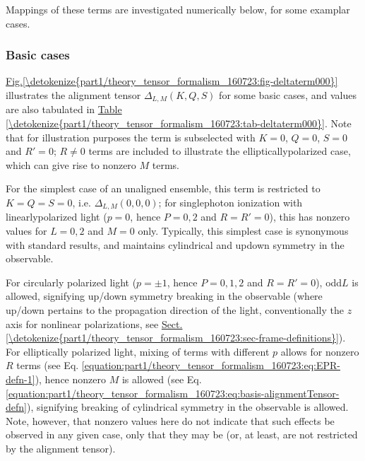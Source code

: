 \documentclass[letterpaper,table,10pt,english]{jupyterBook}
\begin{document}
\sphinxAtStartPar
Mappings of these terms are investigated numerically below, for some examplar cases.


\subsubsection{Basic cases}
\label{\detokenize{part1/theory_tensor_formalism_160723:basic-cases}}\label{\detokenize{part1/theory_tensor_formalism_160723:sec-theory-af-alignment-term-basic}}
\sphinxAtStartPar
\hyperref[\detokenize{part1/theory_tensor_formalism_160723:fig-deltaterm000}]{Fig.\@ \ref{\detokenize{part1/theory_tensor_formalism_160723:fig-deltaterm000}}} illustrates the alignment tensor \(\Delta_{L,M}(K,Q,S)\) for some basic cases, and values are also tabulated in \hyperref[\detokenize{part1/theory_tensor_formalism_160723:tab-deltaterm000}]{Table \ref{\detokenize{part1/theory_tensor_formalism_160723:tab-deltaterm000}}}. Note that for illustration purposes the term is subselected with \(K=0\), \(Q=0\), \(S=0\) and \(R'=0\); \(R\neq0\) terms are included to illustrate the elliptically\sphinxhyphen{}polarized case, which can give rise to non\sphinxhyphen{}zero \(M\) terms.

\sphinxAtStartPar
For the simplest case of an unaligned ensemble, this term is restricted to \(K=Q=S=0\), i.e. \(\Delta_{L,M}(0,0,0)\); for single\sphinxhyphen{}photon ionization with linearly\sphinxhyphen{}polarized light (\(p=0\), hence \(P=0,2\) and \(R=R'=0\)), this has non\sphinxhyphen{}zero values for \(L=0,2\) and \(M=0\) only. Typically, this simplest case is synonymous with standard {\hyperref[\detokenize{backmatter/glossary:term-LF}]{}} results, and maintains cylindrical and up\sphinxhyphen{}down symmetry in the observable.

\sphinxAtStartPar
For circularly polarized light (\(p=\pm1\), hence \(P=0,1,2\) and \(R=R'=0\)), odd\sphinxhyphen{}\(L\) is allowed, signifying up/down symmetry breaking in the observable (where up/down pertains to the propagation direction of the light, conventionally the \(z\)\sphinxhyphen{}axis for non\sphinxhyphen{}linear polarizations, see \hyperref[\detokenize{part1/theory_tensor_formalism_160723:sec-frame-definitions}]{Sect.\@ \ref{\detokenize{part1/theory_tensor_formalism_160723:sec-frame-definitions}}}). For elliptically polarized light, mixing of terms with different \(p\) allows for non\sphinxhyphen{}zero \(R\) terms (see Eq. \eqref{equation:part1/theory_tensor_formalism_160723:eq:EPR-defn-1}), hence non\sphinxhyphen{}zero \(M\) is allowed (see Eq. \eqref{equation:part1/theory_tensor_formalism_160723:eq:basis-alignmentTensor-defn}), signifying breaking of cylindrical symmetry in the observable is allowed. Note, however, that non\sphinxhyphen{}zero values here do not indicate that such effects  be observed in any given case, only that they may be (or, at least, are not restricted by the alignment tensor).
\end{document}

